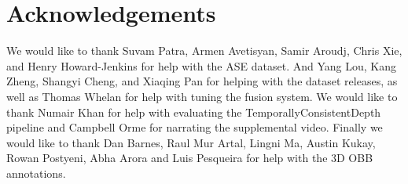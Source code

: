 \section{Acknowledgements}

We would like to thank Suvam Patra, Armen Avetisyan, Samir Aroudj, Chris Xie, and Henry Howard-Jenkins for help with the ASE dataset. 
And Yang Lou, Kang Zheng, Shangyi Cheng, and Xiaqing Pan for helping with the dataset releases,
as well as Thomas Whelan for help with tuning the fusion system. 
We would like to thank Numair Khan for help with evaluating the TemporallyConsistentDepth pipeline and Campbell Orme for narrating the supplemental video.
Finally we would like to thank Dan Barnes, Raul Mur Artal, Lingni Ma, Austin Kukay, Rowan Postyeni, Abha Arora and Luis Pesqueira for help with the 3D OBB annotations. 

